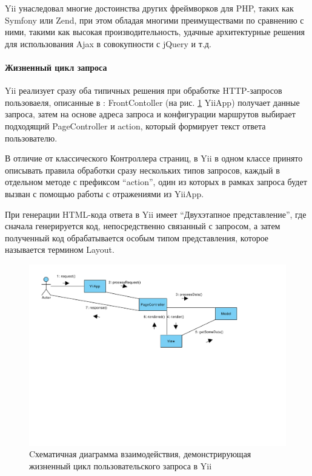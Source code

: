 Yii унаследовал многие достоинства других фреймворков для PHP, таких как Symfony или Zend, 
при этом обладая многими преимуществами по сравнению с ними, такими как высокая производительность,
удачные архитектурные решения для использования Ajax в совокупности с jQuery и т.д.

\paragraph{Жизненный цикл запроса}
Yii реализует сразу оба типичных решения при обработке HTTP-запросов пользоваеля, описанные в \cite{fowler}:
FrontContoller (на рис. \ref{gr:yiirequestflow} YiiApp) получает данные запроса, затем на основе
адреса запроса и конфигурации маршрутов выбирает подходящий PageController и action, который формирует текст ответа пользователю.

В отличие от классического Контроллера страниц, в Yii в одном классе принято описывать правила обработки сразу нескольких
типов запросов, каждый в отдельном методе с префиксом ``action'', один из которых в рамках запроса будет вызван
с помощью работы с отражениями из YiiApp.

При генерации HTML-кода ответа в Yii имеет ``Двухэтапное представление'', где сначала
генерируется код, непосредственно связанный с запросом, а затем полученный код обрабатывается
особым типом представления, которое называется термином Layout.  

\begin{figure}[!ht]
\begin{center}
\includegraphics[scale=0.6, trim=0mm 100mm 40mm 0mm, clip]{../resources/uml/YiiRequestFlow.pdf}
\caption{Cхематичная диаграмма взаимодействия, демонстрирующая жизненный цикл пользовательского запроса в Yii}
\label{gr:yiirequestflow}
\end{center}
\end{figure} 

